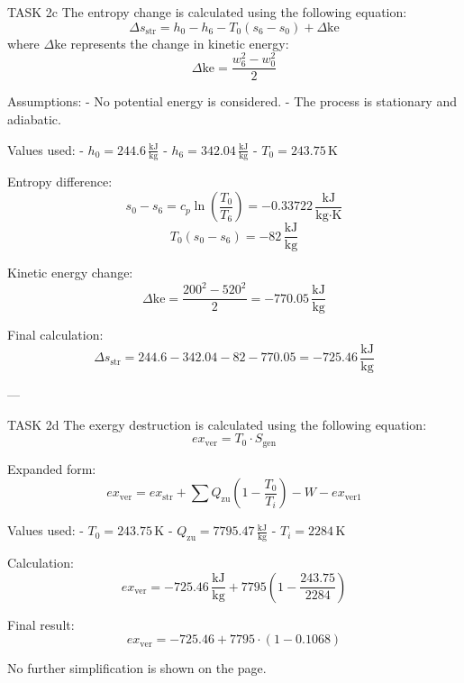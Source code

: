 TASK 2c  
The entropy change is calculated using the following equation:  
\[
\Delta s_{\text{str}} = h_0 - h_6 - T_0(s_6 - s_0) + \Delta \text{ke}
\]  
where \( \Delta \text{ke} \) represents the change in kinetic energy:  
\[
\Delta \text{ke} = \frac{w_6^2 - w_0^2}{2}
\]  

Assumptions:  
- No potential energy is considered.  
- The process is stationary and adiabatic.  

Values used:  
- \( h_0 = 244.6 \, \frac{\text{kJ}}{\text{kg}} \)  
- \( h_6 = 342.04 \, \frac{\text{kJ}}{\text{kg}} \)  
- \( T_0 = 243.75 \, \text{K} \)  

Entropy difference:  
\[
s_0 - s_6 = c_p \ln \left( \frac{T_0}{T_6} \right) = -0.33722 \, \frac{\text{kJ}}{\text{kg·K}}
\]  
\[
T_0(s_0 - s_6) = -82 \, \frac{\text{kJ}}{\text{kg}}
\]  

Kinetic energy change:  
\[
\Delta \text{ke} = \frac{200^2 - 520^2}{2} = -770.05 \, \frac{\text{kJ}}{\text{kg}}
\]  

Final calculation:  
\[
\Delta s_{\text{str}} = 244.6 - 342.04 - 82 - 770.05 = -725.46 \, \frac{\text{kJ}}{\text{kg}}
\]  

---

TASK 2d  
The exergy destruction is calculated using the following equation:  
\[
ex_{\text{ver}} = T_0 \cdot S_{\text{gen}}
\]  

Expanded form:  
\[
ex_{\text{ver}} = ex_{\text{str}} + \sum Q_{\text{zu}} \left( 1 - \frac{T_0}{T_i} \right) - W - ex_{\text{ver1}}
\]  

Values used:  
- \( T_0 = 243.75 \, \text{K} \)  
- \( Q_{\text{zu}} = 7795.47 \, \frac{\text{kJ}}{\text{kg}} \)  
- \( T_i = 2284 \, \text{K} \)  

Calculation:  
\[
ex_{\text{ver}} = -725.46 \, \frac{\text{kJ}}{\text{kg}} + 7795 \left( 1 - \frac{243.75}{2284} \right)
\]  

Final result:  
\[
ex_{\text{ver}} = -725.46 + 7795 \cdot \left( 1 - 0.1068 \right)
\]  

No further simplification is shown on the page.